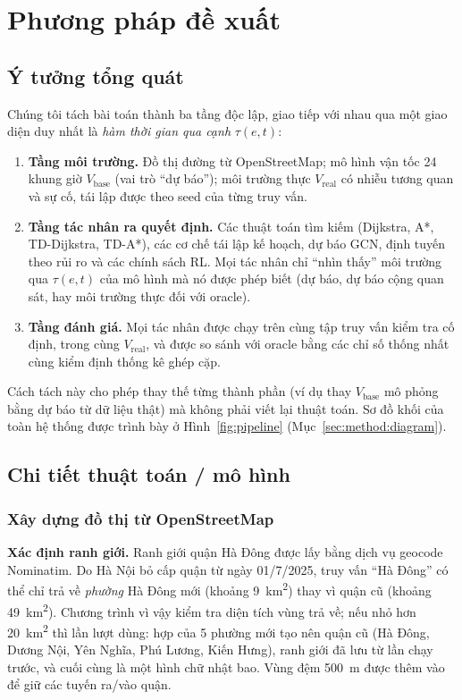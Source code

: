 \section{Phương pháp đề xuất}\label{sec:method}

\subsection{Ý tưởng tổng quát}\label{sec:method:idea}

Chúng tôi tách bài toán thành ba tầng độc lập, giao tiếp với nhau qua một giao diện duy nhất là \emph{hàm thời gian qua
cạnh} $\tau(e,t)$:
\begin{enumerate}[label=(\arabic*)]
    \item \textbf{Tầng môi trường.} Đồ thị đường từ OpenStreetMap; mô hình vận tốc 24 khung giờ $V_{\text{base}}$ (vai
    trò ``dự báo''); môi trường thực $V_{\text{real}}$ có nhiễu tương quan và sự cố, tái lập được theo seed của từng truy vấn.
    \item \textbf{Tầng tác nhân ra quyết định.} Các thuật toán tìm kiếm (Dijkstra, A*, TD-Dijkstra, TD-A*), các cơ chế tái
    lập kế hoạch, dự báo GCN, định tuyến theo rủi ro và các chính sách RL. Mọi tác nhân chỉ ``nhìn thấy'' môi trường qua
    $\tau(e,t)$ của mô hình mà nó được phép biết (dự báo, dự báo cộng quan sát, hay môi trường thực đối với oracle).
    \item \textbf{Tầng đánh giá.} Mọi tác nhân được chạy trên cùng tập truy vấn kiểm tra cố định, trong cùng $V_{\text{real}}$,
    và được so sánh với oracle bằng các chỉ số thống nhất cùng kiểm định thống kê ghép cặp.
\end{enumerate}
Cách tách này cho phép thay thế từng thành phần (ví dụ thay $V_{\text{base}}$ mô phỏng bằng dự báo từ dữ liệu thật) mà
không phải viết lại thuật toán. Sơ đồ khối của toàn hệ thống được trình bày ở Hình~\ref{fig:pipeline}
(Mục~\ref{sec:method:diagram}).

\subsection{Chi tiết thuật toán / mô hình}\label{sec:method:detail}

\subsubsection{Xây dựng đồ thị từ OpenStreetMap}\label{sec:method:graph}

\textbf{Xác định ranh giới.} Ranh giới quận Hà Đông được lấy bằng dịch vụ geocode Nominatim. Do Hà Nội bỏ cấp quận từ
ngày 01/7/2025, truy vấn ``Hà Đông'' có thể chỉ trả về \emph{phường} Hà Đông mới (khoảng 9~km\textsuperscript{2}) thay vì quận
cũ (khoảng 49~km\textsuperscript{2}). Chương trình vì vậy kiểm tra diện tích vùng trả về; nếu nhỏ hơn 20~km\textsuperscript{2}
thì lần lượt dùng: hợp của 5 phường mới tạo nên quận cũ (Hà Đông, Dương Nội, Yên Nghĩa, Phú Lương, Kiến Hưng), ranh
giới đã lưu từ lần chạy trước, và cuối cùng là một hình chữ nhật bao. Vùng đệm 500~m được thêm vào để giữ các tuyến
ra/vào quận.

